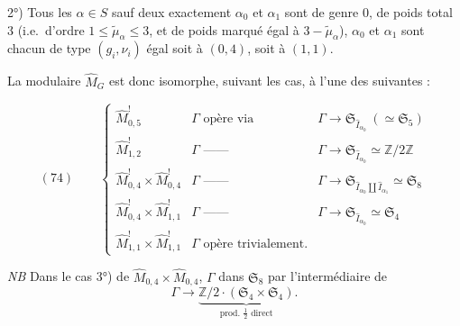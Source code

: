 \documentclass[11pt,a4paper]{article}
\begin{document}
2°) Tous les $\alpha \in S$ sauf deux exactement $\alpha_0$ et $\alpha_1$ sont de genre $0$,  de poids total $3$ (i.e.\ d'ordre $1 \leqslant \tilde{\mu}_\alpha \leqslant 3$, et de poids  marqué égal à $3 - \tilde{\mu}_\alpha$), $\alpha_0$ et $\alpha_1$ sont \struck{\ill{}} chacun de type $(g_i, \hat{\nu}_i)$ égal soit à $(0,4)$, soit à $(1,1)$.

La   modulaire $\widehat{M}_G$ est donc isomorphe, suivant les cas, à l'une des suivantes :

\[
(74)\qquad
\left\{
\begin{array}{lll}
\widehat{M}^{!}_{0,5} & \Gamma \text{ opère via} & \Gamma \to \mathfrak{S}_{\hat{I}_{\alpha_0}} \ (\simeq \mathfrak{S}_5) \\[2pt]
\widehat{M}^{!}_{1,2} & \Gamma \text{ ------} & \Gamma \to \mathfrak{S}_{\hat{I}_{\alpha_0}} \simeq \mathbb{Z}/2\mathbb{Z} \\[2pt]
\widehat{M}^{!}_{0,4} \times \widehat{M}^{!}_{0,4} & \Gamma \text{ ------} & \Gamma \to \mathfrak{S}_{\hat{I}_{\alpha_0} \amalg \hat{I}_{\alpha_1}} \simeq \mathfrak{S}_8 \\[2pt]
\widehat{M}^{!}_{0,4} \times \widehat{M}^{!}_{1,1} & \Gamma \text{ ------} & \Gamma \to \mathfrak{S}_{\hat{I}_{\alpha_0}} \simeq \mathfrak{S}_4 \\[2pt]
\widehat{M}^{!}_{1,1} \times \widehat{M}^{!}_{1,1} & \Gamma \text{ opère trivialement.} &
\end{array}
\right.
\]

\emph{NB} Dans le cas 3°) de $\widehat{M}_{0,4} \times \widehat{M}_{0,4}$, $\Gamma$   dans $\mathfrak{S}_8$ par l'intermédiaire de
\[
\Gamma \longrightarrow \underbrace{\mathbb{Z}/2 \cdot (\mathfrak{S}_4 \times \mathfrak{S}_4)}_{\text{prod.\ }\tfrac{1}{2}\text{ direct}} .
\]
\end{document}
